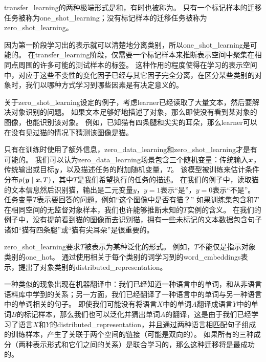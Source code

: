 
\gls{transfer_learning}的两种极端形式是和，有时也被称为。
只有一个标记样本的迁移任务被称为\gls{one_shot_learning}；没有标记样本的迁移任务被称为\gls{zero_shot_learning}。


因为第一阶段学习出的表示就可以清楚地分离类别，所以\gls{one_shot_learning}\citep{Fei-Fei+al-2006}是可能的。
在\gls{transfer_learning}阶段，仅需要一个标记样本来推断表示空间中聚集在相同点周围的许多可能的测试样本的标签。
这种作用的程度使得在学习的表示空间中，对应于这些不变性的变化因子已经与其它因子完全分离，在区分某些类别的对象时，我们以哪种方式学习到哪些因素是有决定意义的。


关于\gls{zero_shot_learning}设定的例子，考虑\gls{learner}已经读取了大量文本，然后要解决对象识别的问题。
如果文本足够好地描述了对象，那么即使没有看到某对象的图像，也能识别该对象。
例如，已知猫有四条腿和尖尖的耳朵，那么\gls{learner}可以在没有见过猫的情况下猜测该图像是猫。


只有在训练时使用了额外信息，\gls{zero_data_learning}\citep{Larochelle2008}和\gls{zero_shot_learning}\citep{Palatucci2009,Socher-2013}才是有可能的。
我们可以认为\gls{zero_data_learning}场景包含三个随机变量：传统输入$\boldsymbol{\mathit{x}}$，传统输出或目标$\boldsymbol{\mathit{y}}$，以及描述任务的附加随机变量，$T$。
该模型被训练来估计条件分布$p(\boldsymbol{\mathit{y}} \mid \boldsymbol{\mathit{x}}, T)$，其中$T$是我们希望执行的任务的描述。
在我们的例子中，读取猫的文本信息然后识别猫，输出是二元变量$y$，$y=1$表示``是''，$y=0$表示``不是''。
任务变量$T$表示要回答的问题，例如``这个图像中是否有猫？''
如果训练集包含和$T$在相同空间的无监督对象样本，我们也许能够推断未知的$T$实例的含义。
在我们的例子中，没有提前看到猫的图像而去识别猫，拥有一些未标记的文本数据包含句子诸如``猫有四条腿''或``猫有尖耳朵''是很重要的。


\gls{zero_shot_learning}要求$T$被表示为某种泛化的形式。
例如，$T$不能仅是指示对象类别的\gls{one_hot}。
通过使用相关于每个类别的词学习到的\gls{word_embeddings}表示，\cite{Socher-2013}提出了对象类别的\gls{distributed_representation}。


一种类似的现象出现在机器翻译中\citep{Klementiev-et-al-COLING2012,Mikolov-et-al-arxiv2013,Gouws-et-al-arxiv2014}：我们已经知道一种语言中的单词，和从非语言语料库中学到的关系；另一方面，我们已经翻译了一种语言中的单词与另一种语言中的单词相关的句子。
即使我们可能没有将语言$X$中的单词$A$翻译成语言$Y$中的单词$B$的标记样本，那么我们也可以泛化并猜出单词$A$的翻译，这是由于我们已经学习了语言$X$和$Y$的\gls{distributed_representation}，并且通过两种语言相匹配句子组成的训练样本，产生了关联于两个空间的链接（可能是双向的）。
如果所有的三种成分（两种表示形式和它们之间的关系）是联合学习的，那么这种迁移将是最成功的。


